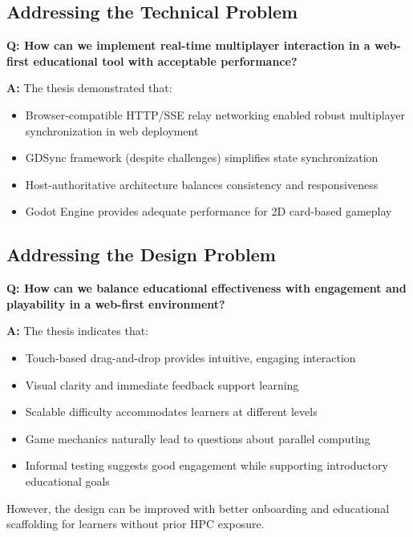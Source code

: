 \subsection{Addressing the Technical Problem}
\label{subsec:technical-problem-answered}

\textbf{Q: How can we implement real-time multiplayer interaction in a web-first educational tool with acceptable performance?}

\textbf{A:} The thesis demonstrated that:
\begin{itemize}
    \item Browser-compatible HTTP/SSE relay networking enabled robust multiplayer synchronization in web deployment
    \item GDSync framework (despite challenges) simplifies state synchronization
    \item Host-authoritative architecture balances consistency and responsiveness
    \item Godot Engine provides adequate performance for 2D card-based gameplay
\end{itemize}

\subsection{Addressing the Design Problem}
\label{subsec:design-problem-answered}

\textbf{Q: How can we balance educational effectiveness with engagement and playability in a web-first environment?}

\textbf{A:} The thesis indicates that:
\begin{itemize}
    \item Touch-based drag-and-drop provides intuitive, engaging interaction
    \item Visual clarity and immediate feedback support learning
    \item Scalable difficulty accommodates learners at different levels
    \item Game mechanics naturally lead to questions about parallel computing
    \item Informal testing suggests good engagement while supporting introductory educational goals
\end{itemize}

However, the design can be improved with better onboarding and educational scaffolding for learners without prior HPC exposure.

